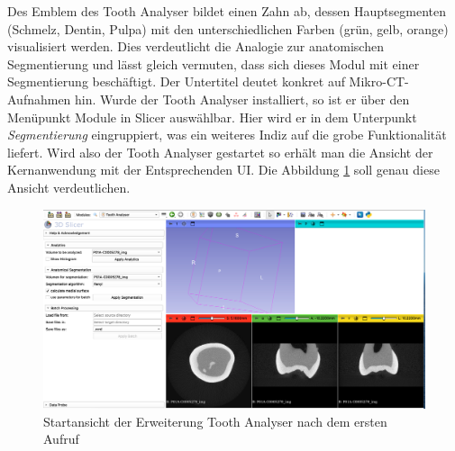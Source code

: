 Des Emblem des Tooth Analyser bildet einen Zahn ab, dessen Hauptsegmenten (Schmelz,
Dentin, Pulpa) mit den unterschiedlichen Farben (grün, gelb, orange)
visualisiert werden. Dies verdeutlicht die Analogie zur anatomischen Segmentierung
und lässt gleich vermuten, dass sich dieses Modul mit einer Segmentierung
beschäftigt. Der Untertitel deutet konkret auf Mikro-\ac{CT}-Aufnahmen hin. Wurde
der Tooth Analyser installiert, so ist er über den Menüpunkt Module in Slicer
auswählbar. Hier wird er in dem Unterpunkt \textit{Segmentierung} eingruppiert, was
ein weiteres Indiz auf die grobe Funktionalität liefert. Wird also der Tooth
Analyser gestartet so erhält man die Ansicht der Kernanwendung mit der
Entsprechenden \ac{UI}. Die Abbildung \ref{fig:tooth_analyser_start_up} soll
genau diese Ansicht verdeutlichen.

\begin{figure}[h]
	\centering
	\includegraphics[scale=0.2, width=\textwidth]{img/toothAnalyserStarUp.png}
	\caption{Startansicht der Erweiterung Tooth Analyser nach dem ersten Aufruf}
	\label{fig:tooth_analyser_start_up}
\end{figure}

